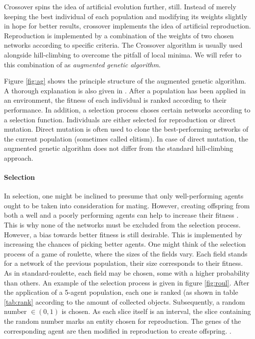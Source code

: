 \documentclass[10pt,a4paper,DIV=11]{scrreprt}
\begin{document}
Crossover spins the idea of artificial evolution further, still. Instead of merely keeping the best individual of each population and modifying 
its weights slightly in hope for better results, crossover implements the idea of artificial reproduction. Reproduction is implemented by a 
combination of the weights of two chosen networks according to specific criteria. The Crossover algorithm is usually used alongside hill-climbing 
to overcome the pitfall of local minima. We will refer to this combination of as \textit{augmented genetic algorithm}.

Figure \ref{fig:ag} shows the principle structure of the augmented genetic algorithm. A thorough explanation is also given in \cite{CROSSOVER}.
After a population has been applied in an environment, the fitness of each individual is ranked according to their performance.  
In addition, a selection process choses certain networks according to a selection function. Individuals are either selected for reproduction 
or direct mutation. Direct mutation is often used to clone the best-performing networks of the current population (sometimes called elitism). 
In case of direct mutation, the augmented genetic algorithm does not differ from the standard hill-climbing approach.

\paragraph{Selection}
In selection, one might be inclined to presume that only well-performing agents ought to be taken into consideration for mating. However, creating
offspring from both a well and a poorly performing agents can help to increase their fitness \cite{KIKLAR}. This is why none
of the networks must be excluded from the selection process. However, a bias towards better fitness is still desirable. This is implemented by 
increasing the chances of picking better agents. One might think of the selection process of a game of roulette, where the sizes of the
fields vary. Each field stands for a network of the previous population, their size corresponds to their fitness. As in standard-roulette, each
field may be chosen, some with a higher probability than others. An example of the selection process is given in figure \ref{fig:roul}. After the 
application of a 5-agent population, each one is ranked (as shown in table \ref{tab:rank} according to the amount of collected objects. Subsequently,
a random number $\in (0,1)$ is chosen. As each slice itself is an interval, the slice containing the random number marks an entity chosen for 
reproduction. The genes of the corresponding agent are then modified in reproduction to create offspring. \textbf{}.
  
\end{document}
